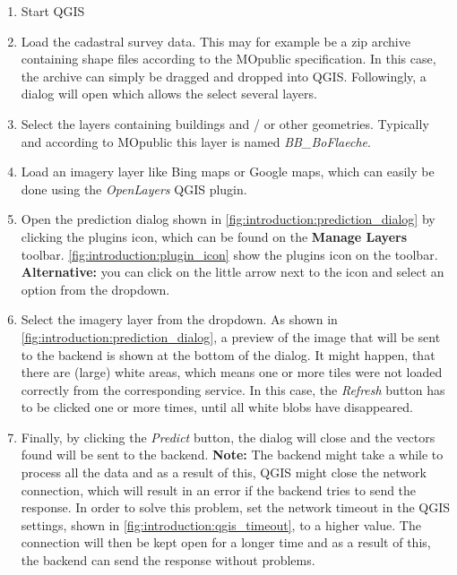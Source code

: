 \begin{enumerate}
    \item Start QGIS
    \item Load the cadastral survey data. This may for example be a zip archive containing shape files according to the MOpublic \cite{mopublic}  specification. In this case, the archive can simply be dragged and dropped into QGIS. Followingly, a dialog will open which allows the select several layers. 
    \item Select the layers containing buildings and / or other geometries. Typically and according to MOpublic this layer is named \textit{BB\_BoFlaeche}.
    \item Load an imagery layer like Bing maps or Google maps, which can easily be done using the \textit{OpenLayers} QGIS plugin.
    \item Open the prediction dialog shown in \autoref{fig:introduction:prediction_dialog} by clicking the plugins icon, which can be found on the \textbf{Manage Layers} toolbar. \autoref{fig:introduction:plugin_icon} show the plugins icon on the toolbar. \textbf{Alternative:} you can click on the little arrow next to the icon and select an option from the dropdown.
    \item Select the imagery layer from the dropdown. As shown in \autoref{fig:introduction:prediction_dialog}, a preview of the image that will be sent to the backend is shown at the bottom of the dialog. It might happen, that there are (large) white areas, which means one or more tiles were not loaded correctly from the corresponding service. In this case, the \textit{Refresh} button has to be clicked one or more times, until all white blobs have disappeared.
    \item Finally, by clicking the \textit{Predict} button, the dialog will close and the vectors found will be sent to the backend. \textbf{Note:} The backend might take a while to process all the data and as a result of this, QGIS might close the network connection, which will result in an error if the backend tries to send the response. In order to solve this problem, set the network timeout in the QGIS settings, shown in \autoref{fig:introduction:qgis_timeout}, to a higher value. The connection will then be kept open for a longer time and as a result of this, the backend can send the response without problems.
\end{enumerate}



